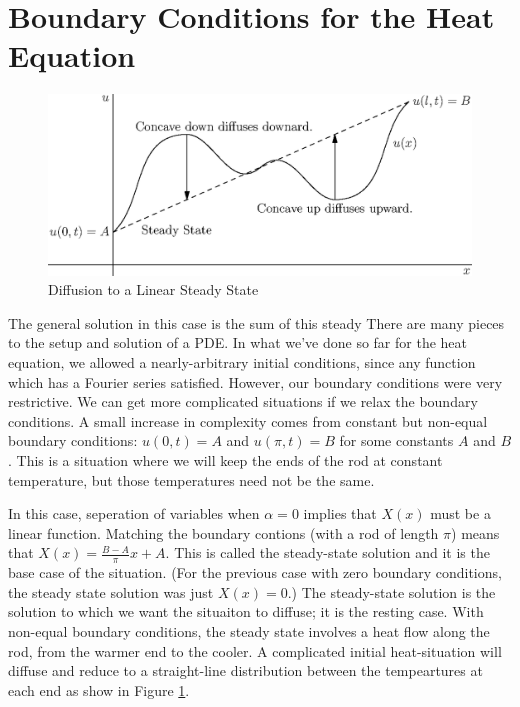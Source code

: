 \documentclass[fleqn,letterpaper]{report}
\begin{document}
\section{Boundary Conditions for the Heat Equation}
\label{heat-equation-boundary}

\begin{figure}[t]
\centering
\includegraphics[width=12cm]{figure43.eps}
\caption{Diffusion to a Linear Steady State}
\label{figure-diffusion1}
\end{figure}

The general solution in this case is the sum of this steady
There are many pieces to the setup and solution of a PDE. In
what we've done so far for the heat equation, we allowed a
nearly-arbitrary initial conditions, since any function which
has a Fourier series satisfied. However, our boundary
conditions were very restrictive. We can get more complicated
situations if we relax the boundary conditions. A small
increase in complexity comes from constant but non-equal
boundary conditions: $u(0,t) = A$ and $u(\pi,t) = B$ for some
constants $A$ and $B$. This is a situation where we will keep
the ends of the rod at constant temperature, but those
temperatures need not be the same.

In this case, seperation of variables when $\alpha = 0$
implies that $X(x)$ must be a linear function. Matching the
boundary contions (with a rod of length $\pi$) means that
$X(x) = \frac{B-A}{\pi}x + A $.  This is called the
steady-state solution and it is the base case of the
situation. (For the previous case with zero boundary
conditions, the steady state solution was just $X(x) = 0$.)
The steady-state solution is the solution to which we want the
situaiton to diffuse; it is the resting case. With non-equal
boundary conditions, the steady state involves a heat flow
along the rod, from the warmer end to the cooler. A
complicated initial heat-situation will diffuse and reduce to a
straight-line distribution between the tempeartures at each
end as show in Figure \ref{figure-diffusion1}.
\end{document}
